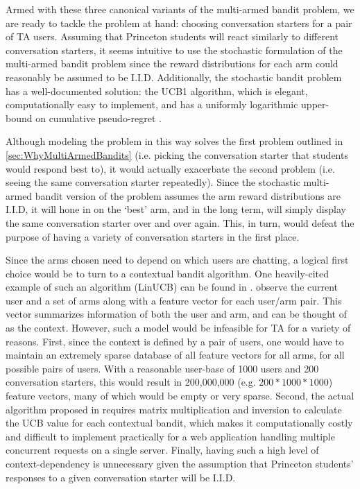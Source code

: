 Armed with these three canonical variants of the multi-armed bandit problem, we are ready to tackle the problem at hand: choosing conversation starters for a pair of TA users. Assuming that Princeton students will react similarly to different conversation starters, it seems intuitive to use the stochastic formulation of the multi-armed bandit problem since the reward distributions for each arm could reasonably be assumed to be I.I.D. Additionally, the stochastic bandit problem has a well-documented solution: the UCB1 algorithm, which is elegant, computationally easy to implement, and has a uniformly logarithmic upper-bound on cumulative pseudo-regret \citep{auer02}.

Although modeling the problem in this way solves the first problem outlined in \autoref{sec:WhyMultiArmedBandits} (i.e. picking the conversation starter that students would respond best to), it would actually exacerbate the second problem (i.e. seeing the same conversation starter repeatedly). Since the stochastic multi-armed bandit version of the problem assumes the arm reward distributions are I.I.D, it will hone in on the `best' arm, and in the long term, will simply display the same conversation starter over and over again. This, in turn, would defeat the purpose of having a variety of conversation starters in the first place.

Since the arms chosen need to depend on which users are chatting, a logical first choice would be to turn to a contextual bandit algorithm. One heavily-cited example of such an algorithm (LinUCB) can be found in \cite{chu10}. \cite{chu10} observe the current user and a set of arms along with a feature vector for each user/arm pair. This vector summarizes information of both the user and arm, and can be thought of as the context. However, such a model would be infeasible for TA for a variety of reasons. First, since the context is defined by a pair of users, one would have to maintain an extremely sparse database of all feature vectors for all arms, for all possible pairs of users. With a reasonable user-base of 1000 users and 200 conversation starters, this would result in 200,000,000 (e.g. $200 * 1000 * 1000$) feature vectors, many of which would be empty or very sparse. Second, the actual algorithm proposed in \cite{chu10} requires matrix multiplication and inversion to calculate the UCB value for each contextual bandit, which makes it computationally costly and difficult to implement practically for a web application handling multiple concurrent requests on a single server. Finally, having such a high level of context-dependency is unnecessary given the assumption that Princeton students' responses to a given conversation starter will be I.I.D.

